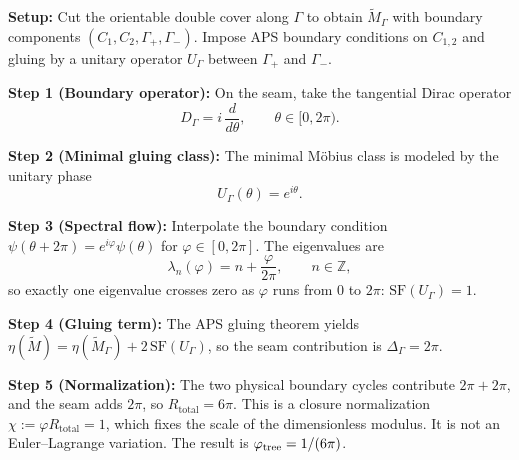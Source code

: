 \begin{tcolorbox}[colback=green!3, colframe=green!50!black, 
    title={\textbf{Proof Sketch for $\phitree = 1/(6\pi)$ (via $\eta$-gluing)}}, fonttitle=\bfseries\small]
\textbf{Setup:} Cut the orientable double cover along $\Gamma$ to obtain
$\widetilde{M}_\Gamma$ with boundary components $(C_1,C_2,\Gamma_+,\Gamma_-)$.
Impose APS boundary conditions on $C_{1,2}$ and gluing by a unitary operator
$U_\Gamma$ between $\Gamma_+$ and $\Gamma_-$.

\textbf{Step 1 (Boundary operator):} On the seam, take the tangential Dirac operator
\begin{equation}
    D_\Gamma = i\,\frac{d}{d\theta}, \qquad \theta\in[0,2\pi).
\end{equation}

\textbf{Step 2 (Minimal gluing class):} The minimal M\"obius class is modeled by the
unitary phase
\begin{equation}
    U_\Gamma(\theta)=e^{i\theta}.
\end{equation}

\textbf{Step 3 (Spectral flow):} Interpolate the boundary condition
$\psi(\theta+2\pi)=e^{i\varphi}\psi(\theta)$ for $\varphi\in[0,2\pi]$. The eigenvalues are
\begin{equation}
    \lambda_n(\varphi)=n+\frac{\varphi}{2\pi}, \qquad n\in\mathbb{Z},
\end{equation}
so exactly one eigenvalue crosses zero as $\varphi$ runs from $0$ to $2\pi$:
$\mathrm{SF}(U_\Gamma)=1$.

\textbf{Step 4 (Gluing term):} The APS gluing theorem yields
$\eta(\widetilde{M}) = \eta(\widetilde{M}_\Gamma) + 2\,\mathrm{SF}(U_\Gamma)$,
so the seam contribution is $\Delta_\Gamma=2\pi$.

\textbf{Step 5 (Normalization):} The two physical boundary cycles contribute $2\pi+2\pi$,
and the seam adds $2\pi$, so $R_{\text{total}}=6\pi$.
This is a closure normalization $\chi := \varphi R_{\text{total}} = 1$,
which fixes the scale of the dimensionless modulus.
It is not an Euler--Lagrange variation.
The result is $\phitree=1/(6\pi)$.
\end{tcolorbox}

